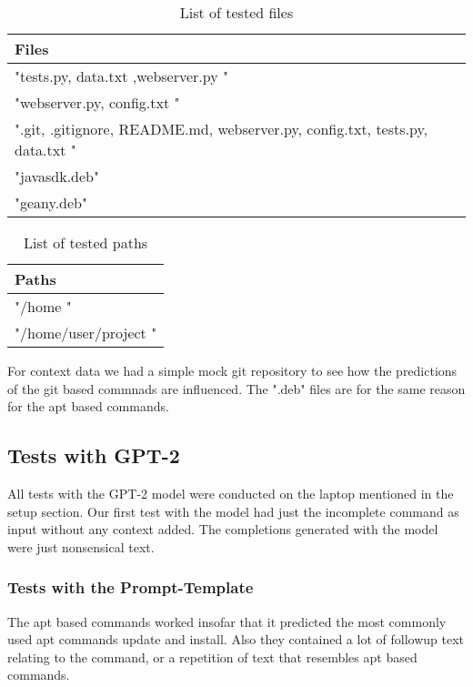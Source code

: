 \pagebreak

\begin{table}[ht]
\centering
\begin{tabular}{|l|}
\hline
\textbf{Files} \\
\hline
"tests.py, data.txt ,webserver.py " \\
"webserver.py, config.txt " \\
".git, .gitignore, README.md, webserver.py, config.txt, tests.py, data.txt " \\
"javasdk.deb"\\
"geany.deb"\\
\hline
\end{tabular}
\caption{List of tested files}
\end{table}

\begin{table}[ht]
\centering
\begin{tabular}{|l|}
\hline
\textbf{Paths} \\
\hline
"/home " \\
"/home/user/project " \\
\hline
\end{tabular}
\caption{List of tested paths}
\end{table}

For context data we had a simple mock git repository to see how the predictions of the git based commnads are influenced. The ".deb" files are for the same reason for the apt based commands.





\subsection{Tests with GPT-2}\raggedbottom

All tests with the GPT-2 model were conducted on the laptop mentioned in the setup section.
Our first test with the model had just the incomplete command as input without any context added. The completions generated with the model were just nonsensical text.



\subsubsection{Tests with the Prompt-Template}

 The apt based commands  worked insofar that it predicted the most commonly used apt commands update and install. Also they contained a lot of followup text relating to the command, or a repetition of text that resembles apt based commands.


